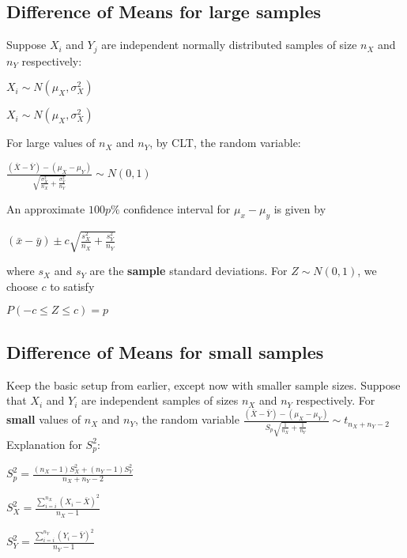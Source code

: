 \documentclass[12pt]{report}
\begin{document}
    \subsection{Difference of Means for large samples}
      Suppose $X_i$ and $Y_j$ are independent normally distributed samples of size $n_X$ and $n_Y$ respectively:
      \begin{center}
        $X_i \sim N(\mu_X, \sigma^2_X)$
      \end{center}
      \begin{center}
        $X_i \sim N(\mu_X, \sigma^2_X)$
      \end{center}
      For large values of $n_X$ and $n_Y$, by CLT, the random variable:
      \begin{center}
        $\frac{(\bar{X} - \bar{Y}) - (\mu_X - \mu_Y)}{\sqrt{\frac{\sigma_X^2}{n_X} + \frac{\sigma^2_Y}{n_Y}}} \sim N(0, 1)$
      \end{center}

      An approximate $100p\%$ confidence interval for $\mu_x - \mu_y$ is given by
      \begin{center}
        $ (\bar{x} - \bar{y}) \pm c \sqrt{ \frac{s^2_X}{n_X} + \frac{s^2_Y}{n_Y} } $
      \end{center}
      where $s_X$ and $s_Y$ are the \textbf{sample} standard deviations. For $Z \sim N(0, 1)$, we choose $c$ to satisfy
      \begin{center}$P(-c \le Z \le c) = p$\end{center}

    \subsection{Difference of Means for small samples}
      Keep the basic setup from earlier, except now with smaller sample sizes. Suppose that $X_i$ and $Y_i$ are independent samples of sizes $n_X$ and $n_Y$ respectively. For \textbf{small} values of $n_X$ and $n_Y$, the random variable
      $\frac{(\bar{X} - \bar{Y}) - (\mu_X - \mu_Y)}{S_p\sqrt{\frac{1}{n_X} + \frac{1}{n_Y}}} \sim t_{n_X + n_Y - 2}$
      Explanation for $S^2_p$:
      \begin{center}$S^2_p = \frac{(n_X - 1) S^2_X + (n_Y - 1) S^2_Y}{n_X + n_Y - 2}$\end{center}
      \begin{center}$S^2_X = \frac{\sum_{i=i}^{n_X} (X_i - \bar{X})^2}{n_X - 1}$\end{center}
      \begin{center}$S^2_Y = \frac{\sum_{i=i}^{n_Y} (Y_i - \bar{Y})^2}{n_Y - 1}$\end{center}
\end{document}
